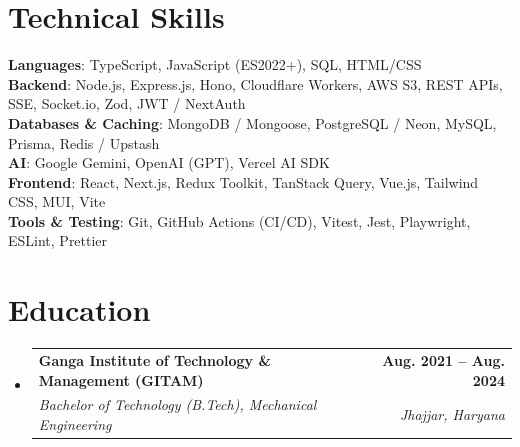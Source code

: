 \documentclass[letterpaper,11pt]{article}
\makeatletter
\newcommand{\resumeSubheading}[4]{
  \vspace{-2pt}\item
    \begin{tabular*}{1.0\textwidth}[t]{l@{\extracolsep{\fill}}r}
      \textbf{#1} & \textbf{\small #2} \\
      \textit{\small#3} & \textit{\small #4} \\
    \end{tabular*}\vspace{-7pt}
}
\newcommand{\resumeSubHeadingListStart}{\begin{itemize}[leftmargin=0.0in, label={}]}
\newcommand{\resumeSubHeadingListEnd}{\end{itemize}}
\makeatother
\begin{document}
\section{Technical Skills}
 \begin{itemize}[leftmargin=0.15in, label={}]
    \small{\item{
     \textbf{Languages}{: TypeScript, JavaScript (ES2022+), SQL, HTML/CSS} \\
     \textbf{Backend}{: Node.js, Express.js, Hono, Cloudflare Workers, AWS S3, REST APIs, SSE, Socket.io, Zod, JWT / NextAuth} \\
     \textbf{Databases \& Caching}{: MongoDB / Mongoose, PostgreSQL / Neon, MySQL, Prisma, Redis / Upstash} \\
     \textbf{AI}{: Google Gemini, OpenAI (GPT), Vercel AI SDK} \\
     \textbf{Frontend}{: React, Next.js, Redux Toolkit, TanStack Query, Vue.js, Tailwind CSS, MUI, Vite} \\
     \textbf{Tools \& Testing}{: Git, GitHub Actions (CI/CD), Vitest, Jest, Playwright, ESLint, Prettier} \\
    }}
 \end{itemize}
\vspace{-9pt}

\section{Education}
  \resumeSubHeadingListStart
    \resumeSubheading
      {Ganga Institute of Technology \& Management (GITAM)}{Aug. 2021 -- Aug. 2024}
      {Bachelor of Technology (B.Tech), Mechanical Engineering}{Jhajjar, Haryana}
  \resumeSubHeadingListEnd
\end{document}
